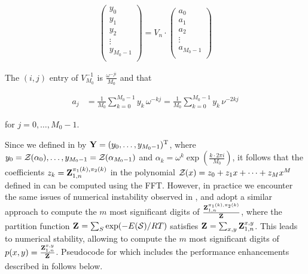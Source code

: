 \documentclass[11pt, oneside]{Thesis} %
\begin{document}
\begin{align}
\label{eq:ffttwo:dftMatrix}
\left(
\begin{array}{l}
y_0 \\
y_1 \\
y_2 \\
\vdots \\
y_{M_0-1} \\
\end{array}
\right)
= V_n \cdot
\left(
\begin{array}{l}
a_0 \\
a_1 \\
a_2 \\
\vdots \\
a_{M_0-1} \\
\end{array}
\right)
\end{align}

The $(i,j)$ entry of $V_{M_0}^{-1}$ is $\frac{\omega^{-j i}}{M_0}$
and that

\begin{align}
\label{eq:ffttwo:aFromY}
a_j &=\frac{1}{M_0} \sum_{k=0}^{M_0-1} y_k\, \omega^{-kj}
=\frac{1}{M_0} \sum_{k=0}^{M_0-1} y_k\, \nu^{-2kj}
\end{align}

for $j=0,\dots,M_0-1$.

Since we defined \bfY in  by ${\bf Y} =
(y_0,\dots,y_{M_0-1})^{\text T}$, where
$y_0={\mathcal Z}_{}(\alpha_0),\dots,\allowbreak y_{M_0-1}={\mathcal Z}_{}(\alpha_{M_0-1})$
and $\alpha_k = \omega^k
\exp(\frac{k \cdot 2\pi i}{M_0})$,
it follows that the coefficients
$z_k={\bf Z}^{\pi_1(k),\pi_2(k)}_{1,n}$ in the polynomial
${\mathcal Z}_{}(x) = z_0 + z_1 x + \dots + z_{M} x^{M}$ defined in
 can be computed using the FFT.
However, in practice we encounter the same issues of numerical instability
observed in , and adopt a similar approach
to compute the $m$ most significant
digits of $\frac{{\bf Z}^{\pi_1(k),\pi_2(k)}_{1,n}}{{\bf Z}^{}_{}}$,
where the partition function ${\bf Z}^{}_{} = \sum_{S} \exp(-E(\mathcal S)/RT)$ satisfies
${{\bf Z}^{}_{}} = \sum_{x,y} {\bf Z}^{x,y}_{1,n}$. This leads to numerical stability,
allowing \ffttwo to compute the
$m$ most significant digits of $p(x,y) = \frac{{\bf Z}^{x,y}_{1,n}}{{\bf Z}^{}_{}}$.
Pseudocode for \ffttwo which includes the performance enhancements described in
 follows below.
\medskip
\end{document}
